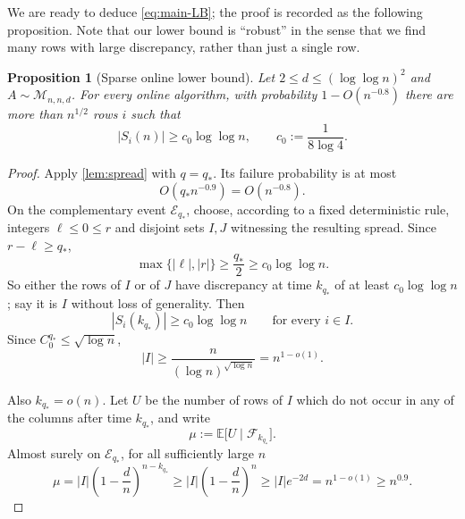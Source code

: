 \documentclass[reqno,english]{amsart}
\newcommand*{\EE}{\mathbb E}
\newcommand*{\calF}{\mathcal F}
\newcommand*{\calM}{\mathcal M}
\newtheorem{proposition}[proposition]{Proposition}
\theoremstyle{definition}
\begin{document}
We are ready to deduce \eqref{eq:main-LB}; the proof is recorded as the following proposition. Note that our lower bound is ``robust'' in the sense that we find many rows with large discrepancy, rather than just a single row. 

\begin{proposition}[Sparse online lower bound]\label{prop:sparse-lower}
Let $2\le d\le(\log\log n)^2$ and $A\sim\calM_{n,n,d}$.  For every online
algorithm, with probability
$1-O(n^{-0.8})$ there are more than $n^{1/2}$ rows $i$ such that
\[
    |S_i(n)|\ge c_0\log\log n,
    \qquad c_0:=\frac1{8\log4}.
\]
\end{proposition}

\begin{proof}
Apply \cref{lem:spread} with $q=q_*$. Its failure probability is at most
\[
    O(q_*n^{-0.9})=O(n^{-0.8}).
\]
On the complementary event $\mathcal E_{q_*}$, choose, according to a fixed
deterministic rule, integers $\ell\le0\le r$ and disjoint sets
$I,J$ witnessing the resulting spread. Since
$r-\ell\ge q_*$,
\[
    \max\{|\ell|,|r|\}\ge \frac{q_*}{2}
    \ge c_0\log\log n.
\]
So either the rows of $I$ or of $J$ have
discrepancy at time $k_{q_*}$ of at least $c_0\log\log n$; say it is $I$ without loss of generality. Then
\[
    |S_i(k_{q_*})|\ge c_0\log\log n
    \qquad\text{for every }i\in I.
\]
Since $C_0^{q_*}\le\sqrt{\log n}$,
\[
    |I|\ge \frac{n}{(\log n)^{\sqrt{\log n}}}=n^{1-o(1)}.
\]

Also $k_{q_*}=o(n)$. Let $U$ be the number of rows of $I$ which do not occur
in any of the columns after time $k_{q_*}$, and write
\[
    \mu:=\EE\big[U\mid\calF_{k_{q_*}}\big].
\]
Almost surely on $\mathcal E_{q_*}$, for all sufficiently large $n$
\[
    \mu
    =|I|\left(1-\frac dn\right)^{n-k_{q_*}}
    \ge |I|\left(1-\frac dn\right)^n
    \ge |I|e^{-2d}
    =n^{1-o(1)}
    \ge n^{0.9}.
\]


\end{proof}
\end{document}

